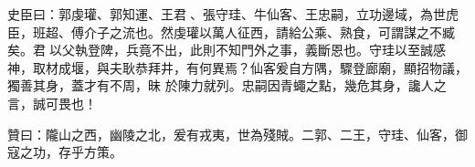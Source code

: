\begin{pinyinscope}
 史臣曰：郭虔瓘、郭知運、王君、張守珪、牛仙客、王忠嗣，立功邊域，為世虎臣，班超、傅介子之流也。然虔瓘以萬人征西，請給公乘、熟食，可謂謀之不臧矣。君以父執登陴，兵竟不出，此則不知門外之事，義斷恩也。守珪以至誠感神，取材成堰，與夫耿恭拜井，有何異焉？仙客爰自方隅，驟登廊廟，顯招物議，獨善其身，蓋才有不周，昧
 於陳力就列。忠嗣因青蠅之點，幾危其身，讒人之言，誠可畏也！



 贊曰：隴山之西，幽陵之北，爰有戎夷，世為殘賊。二郭、二王，守珪、仙客，御寇之功，存乎方策。



\end{pinyinscope}